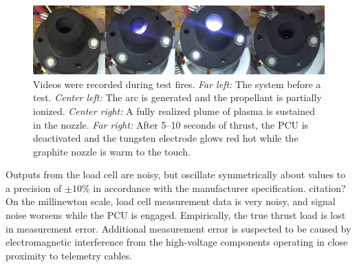 \documentclass[journal]{IEEEtran}
\begin{document}
\begin{figure}
  \includegraphics[width=\linewidth]{figs/burnsnapshots.png}
  \caption{Videos were recorded during test fires.
  \emph{Far left:} The system before a test.
  \emph{Center left:} The arc is generated and the propellant is partially ionized.
  \emph{Center right:} A fully realized plume of plasma is sustained in the nozzle.
  \emph{Far right:} After 5--10 seconds of thrust, the PCU is deactivated and the tungsten electrode glows red hot while the graphite nozzle is warm to the touch.
\label{fig:burn-snapshots}}
\end{figure}

Outputs from the load cell are noisy, but oscillate symmetrically about values to a precision of $\pm10\%$ in accordance with the manufacturer specification. {\color{red}citation?}
On the millinewton scale, load cell measurement data is very noisy, and signal noise worsens while the PCU is engaged.
%
Empirically, the true thrust load is lost in measurement error.
Additional measurement error is suspected to be caused by electromagnetic interference from the high-voltage components operating in close proximity to telemetry cables.
\end{document}
